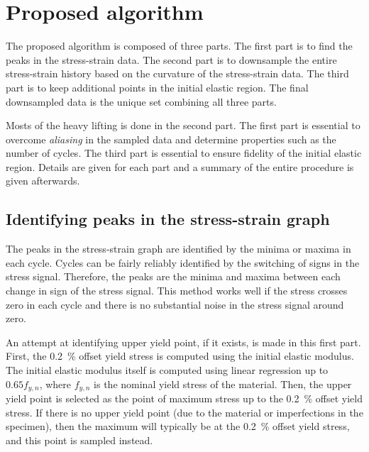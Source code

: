 \documentclass[a4paper,11pt]{article}
\begin{document}
\section{Proposed algorithm}

The proposed algorithm is composed of three parts.
The first part is to find the peaks in the stress-strain data.
The second part is to downsample the entire stress-strain history based on the curvature of the stress-strain data.
The third part is to keep additional points in the initial elastic region.
The final downsampled data is the unique set combining all three parts.

Mosts of the heavy lifting is done in the second part.
The first part is essential to overcome \emph{aliasing} in the sampled data and determine properties such as the number of cycles.
The third part is essential to ensure fidelity of the initial elastic region.
Details are given for each part and a summary of the entire procedure is given afterwards.



\subsection{Identifying peaks in the stress-strain graph}

The peaks in the stress-strain graph are identified by the minima or maxima in each cycle.
Cycles can be fairly reliably identified by the switching of signs in the stress signal.
Therefore, the peaks are the minima and maxima between each change in sign of the stress signal.
This method works well if the stress crosses zero in each cycle and there is no substantial noise in the stress signal around zero.

An attempt at identifying upper yield point, if it exists, is made in this first part.
First, the 0.2~\% offset yield stress is computed using the initial elastic modulus.
The initial elastic modulus itself is computed using linear regression up to $0.65 f_{y,n}$, where $f_{y,n}$ is the nominal yield stress of the material.
Then, the upper yield point is selected as the point of maximum stress up to the 0.2~\% offset yield stress.
If there is no upper yield point (due to the material or imperfections in the specimen), then the maximum will typically be at the 0.2~\% offset yield stress, and this point is sampled instead.
\end{document}

